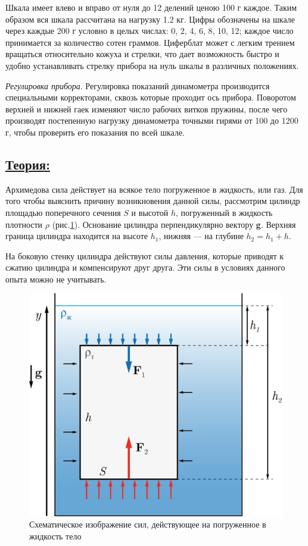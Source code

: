 \documentclass[14pt,a4paper,oneside]{extarticle}	%
\begin{document}
Шкала имеет влево и вправо от нуля до 12 делений ценою 100 г каждое.
Таким образом вся шкала рассчитана на нагрузку 1.2 кг.
Цифры обозначены на шкале через каждые 200 г условно в целых числах: 0, 2, 4, 6, 8, 10, 12; каждое число принимается за количество сотен граммов.
Циферблат может с легким трением вращаться относительно кожуха и стрелки, что дает возможность быстро и удобно устанавливать стрелку прибора на нуль шкалы в различных положениях.

\textit{Регулировка прибора}. Регулировка показаний динамометра производится специальными корректорами, сквозь которые проходит ось прибора.
Поворотом верхней и нижней гаек изменяют число рабочих витков пружины, после чего производят постепенную нагрузку динамометра точными гирями от 100 до 1200 г, чтобы проверить его показания по всей шкале.

\newpage
\subsection*{\underline{Теория:}}

Архимедова сила действует на всякое тело погруженное в жидкость, или газ.
Для того чтобы выяснить причину возникновения данной силы, рассмотрим цилиндр площадью поперечного сечения $ S $ и высотой $ h $, погруженный в жидкость плотности $\rho$ (рис.\ref{newton-4}). 
Основание цилиндра перпендикулярно вектору \textbf{g}. 
Верхняя граница цилиндра находится на высоте $ h_{1} $, нижняя — на глубине $ h_{2} = h_{1} + h $.

На боковую стенку цилиндра действуют силы давления, которые приводят к сжатию цилиндра и компенсируют друг друга.
Эти силы в условиях данного опыта можно не учитывать.

\begin{figure}[H] 
	\centering 	
	\includegraphics[width=0.6\linewidth]{newton-4.png}
	\caption{Схематическое изображение сил, действующее на погруженное в жидкость тело}
	\label{newton-4}
\end{figure}
\end{document}
